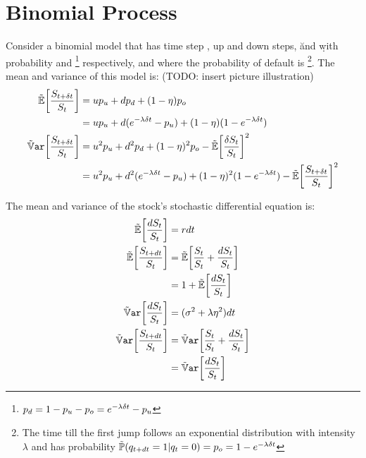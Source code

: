 \documentclass[a4paper,11pt,oneside]{report}
\theoremstyle{plain}
\theoremstyle{definition}
\begin{document}
\section{Binomial Process}
Consider a binomial model that has time step \Dt, up and down steps, \u and \d with probability \pu and \pd\footnote{$p_d = 1 - p_u - p_o = e^{-\lambda\delta t} - p_u$} respectively, and where the probability of default is \po\footnote{The time till the first jump follows an exponential distribution with intensity $\lambda$ and has probability $\Prob(q_{t + \dt} = 1 | q_t = 0) = \po = 1 - e^{-\lambda\Dt}$}.  The mean and variance of this model is: (TODO: insert picture illustration)
\begin{align}
 \E[\frac{S_{t + \Dt}}{\S}]     &= \u\pu + \d\pd + (1 - \eta)\po \n
                                &= \u\pu + \d(e^{-\lambda\Dt} - \pu) + (1 - \eta)(1 - e^{-\lambda\Dt}) \label{eq:BM_E} \\
 \Var[\frac{S_{t + \Dt}}{\S}]   &= \u^2\pu + \d^2\pd + (1 - \eta)^2\po - \E[\frac{\DS}{\S}]^2 \n
                                &= \u^2\pu + \d^2(e^{-\lambda\Dt} - \pu) + (1 - \eta)^2(1 - e^{-\lambda\Dt}) - \E[\frac{S_{t+\Dt}}{\S}]^2 \label{eq:BM_Var}
\end{align}

The mean and variance of the stock's stochastic differential equation is:
\begin{align}
 \E[\frac{\dS}{\S}]     &= r\dt \\
 \E[\frac{S_{t + \dt}}{\S}] &= \E[\frac{\S}{\S} + \frac{\dS}{\S}] \n
                        &= 1 + \E[\frac{\dS}{\S}] \label{eq:SM_E} \\
 \Var[\frac{\dS}{\S}]   &= (\sigma^2 + \lambda\eta^2)\dt \\
 \Var[\frac{S_{t + \dt}}{\S}] &= \Var[\frac{\S}{\S} + \frac{\dS}{\S}] \n
                        &= \Var[\frac{\dS}{\S}] \label{eq:SM_Var}
\end{align}


\end{document}
